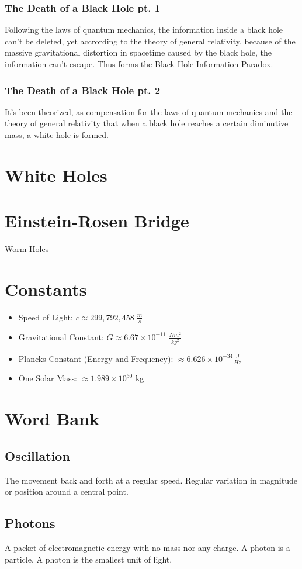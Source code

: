 \documentclass{article}
\begin{document}
\subsubsection{The Death of a Black Hole pt. 1}
Following the laws of quantum mechanics, the information inside a black hole can't be deleted, yet accrording to the theory of general relativity, because of the massive gravitational distortion in spacetime caused by the black hole, the information can't escape. Thus forms the Black Hole Information Paradox.

\subsubsection{The Death of a Black Hole pt. 2}
It's been theorized, as compensation for the laws of quantum mechanics and the theory of general relativity that when a black hole reaches a certain diminutive mass, a white hole is formed.


\section{White Holes}



\section{Einstein-Rosen Bridge}
Worm Holes



\section{Constants}\label{sec:constants}
\begin{itemize}
    \item Speed of Light: $c \approx 299,792,458\;\frac{m}{s}$
    \item Gravitational Constant: $G \approx 6.67 \times 10^{-11}\;\frac{Nm^2}{kg^2}$
    \item Plancks Constant (Energy and Frequency): $\approx 6.626\times 10^{-34}\frac{J}{Hz}$
    \item One Solar Mass: $\approx 1.989 \times 10^{30}$ kg
\end{itemize}

\section{Word Bank}
\subsection{Oscillation}\label{sec:oscillation}
The movement back and forth at a regular speed. Regular variation in magnitude or position around a central point.

\subsection{Photons}\label{sec:photons}
A packet of electromagnetic energy with no mass nor any charge. A photon is a particle. A photon is the smallest unit of light.
\end{document}
